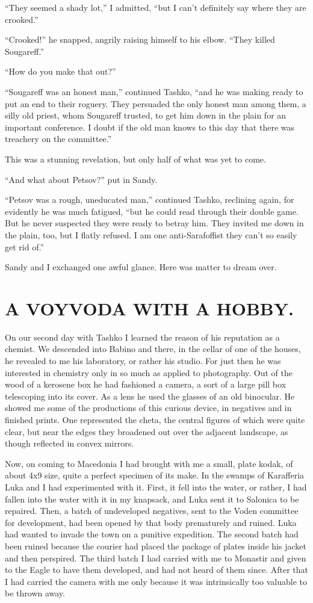 \documentclass[a5paper,12pt]{book}
\begin{document}
“They seemed a shady lot,” I admitted, “but I can’t definitely say where they are crooked.”

“Crooked!” he snapped, angrily raising himself to his elbow. “They killed Sougareff.”

“How do you make that out?”

“Sougareff was an honest man,” continued Tashko, “and he was making ready to put an end to their roguery. They persuaded the only honest man among them, a silly old priest, whom Sougareff trusted, to get him down in the plain for an important conference. I doubt if the old man knows to this day that there was treachery on the committee.”

This was a stunning revelation, but only half of what was yet to come.

“And what about Petsov?” put in Sandy.

“Petsov was a rough, uneducated man,” continued Tashko, reclining again, for evidently he was much fatigued, “but he could read through their double game. But he never suspected they were ready to betray him. They invited me down in the plain, too, but I flatly refused. I am one anti-Sarafoffist they can’t so easily get rid of.”

Sandy and I exchanged one awful glance. Here was matter to dream over.


\chapter{A VOYVODA WITH A HOBBY.}

On our second day with Tashko I learned the reason of his reputation as a chemist. We descended into Babino and there, in the cellar of one of the houses, he revealed to me his laboratory, or rather his studio. For just then he was interested in chemistry only in so much as applied to photography. Out of the wood of a kerosene box he had fashioned a camera, a sort of a large pill box telescoping into its cover. As a lens he used the glasses of an old binocular. He showed me some of the productions of this curious device, in negatives and in finished prints. One represented the cheta, the central figures of which were quite clear, but near the edges they broadened out over the adjacent landscape, as though reflected in convex mirrors.

Now, on coming to Macedonia I had brought with me a small, plate kodak, of about 4x9 size, quite a perfect specimen of its make. In the swamps of Karafferia Luka and I had experimented with it. First, it fell into the water, or rather, I had fallen into the water with it in my knapsack, and Luka sent it to Salonica to be repaired. Then, a batch of undeveloped negatives, sent to the Voden committee for development, had been opened by that body prematurely and ruined. Luka had wanted to invade the town on a punitive expedition. The second batch had been ruined because the courier had placed the package of plates inside his jacket and then perspired. The third batch I had carried with me to Monastir and given to the Eagle to have them developed, and had not heard of them since. After that I had carried the camera with me only because it was intrinsically too valuable to be thrown away.
\end{document}
